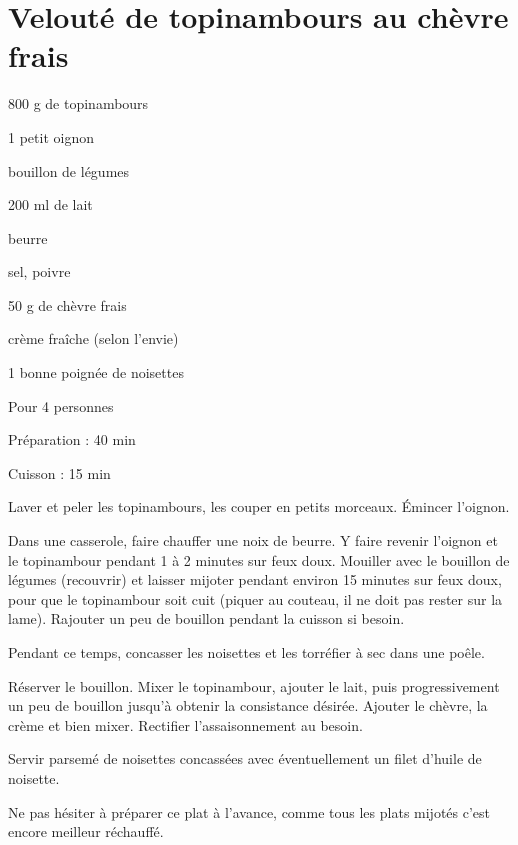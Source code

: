 \section{Velouté de topinambours au chèvre frais}

\begin{ingredients}
\item 800 g de topinambours
\item 1 petit oignon
\item bouillon de légumes
\item 200 ml de lait
\item beurre
\item sel, poivre
\item 50 g de chèvre frais
\item crème fraîche (selon l'envie)
\item 1 bonne poignée de noisettes
\end{ingredients}
\begin{infos}
\item Pour 4 personnes		%
\item Préparation : 40 min		%
\item Cuisson : 15 min			%
\end{infos}
\begin{etapes}
\item Laver et peler les topinambours, les couper en petits morceaux. Émincer l'oignon.
\item Dans une casserole, faire chauffer une noix de beurre. Y faire revenir l'oignon et le topinambour pendant 1 à 2 minutes sur feux doux. Mouiller avec le bouillon de légumes (recouvrir) et laisser mijoter pendant environ 15 minutes sur feux doux, pour que le topinambour soit cuit (piquer au couteau, il ne doit pas rester sur la lame). Rajouter un peu de bouillon pendant la cuisson si besoin.
\item Pendant ce temps, concasser les noisettes et les torréfier à sec dans une poêle.
\item Réserver le bouillon. Mixer le topinambour, ajouter le lait, puis progressivement un peu de bouillon jusqu'à obtenir la consistance désirée. Ajouter le chèvre, la crème et bien mixer. Rectifier l'assaisonnement au besoin.
\item Servir parsemé de noisettes concassées avec éventuellement un filet d'huile de noisette.
\end{etapes}
\begin{conseils}
Ne pas hésiter à préparer ce plat à l'avance, comme tous les plats mijotés c'est encore meilleur réchauffé.
\end{conseils}




